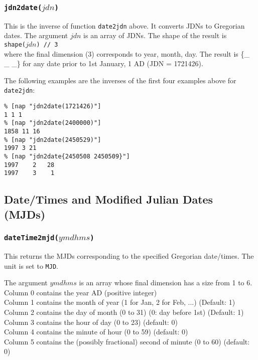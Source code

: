 \subsubsection{\texttt{jdn2date(}$jdn$\texttt{)}}
        \label{date-function-jdn2date} 

This is the inverse of function 
      \texttt{date2jdn} above. It converts JDNs to Gregorian dates.
      The argument 
      $jdn$ is an array of JDNs. The shape of the result is
      \\
      \texttt{shape($jdn$) // 3}
      \\where the final dimension (3) corresponds to year, month,
      day. The result is \{\_ \_ \_\} for any date prior to 1st January, 1
      AD (JDN = 1721426).
      

The following examples are the inverses of the first four
      examples above for 
      \texttt{date2jdn}:
      \begin{verbatim}
% [nap "jdn2date(1721426)"]
1 1 1
% [nap "jdn2date(2400000)"]
1858 11 16
% [nap "jdn2date(2450529)"]
1997 3 21
% [nap "jdn2date{2450508 2450509}"]
1997    2   28
1997    3    1
\end{verbatim}

\subsection{Date/Times and Modified Julian Dates (MJDs)}
        \label{date-function-mjd}

\subsubsection{\texttt{dateTime2mjd(}$ymdhms$\texttt{)}}
    \label{date-function-dateTime2mjd}

This returns the MJDs corresponding to the specified
      Gregorian date/times. The unit is set to 
      \texttt{MJD}.
      

The argument 
      $ymdhms$ is an array whose final dimension has a size
      from 1 to 6.
      \\Column 0 contains the year AD (positive integer)
      \\Column 1 contains the month of year (1 for Jan, 2 for Feb,
      ...) (Default: 1)
      \\Column 2 contains the day of month (0 to 31) (0: day before
      1st) (Default: 1)
      \\Column 3 contains the hour of day (0 to 23) (default: 0)
      \\Column 4 contains the minute of hour (0 to 59) (default: 0)
      \\Column 5 contains the (possibly fractional) second of
      minute (0 to 60) (default: 0)
      


